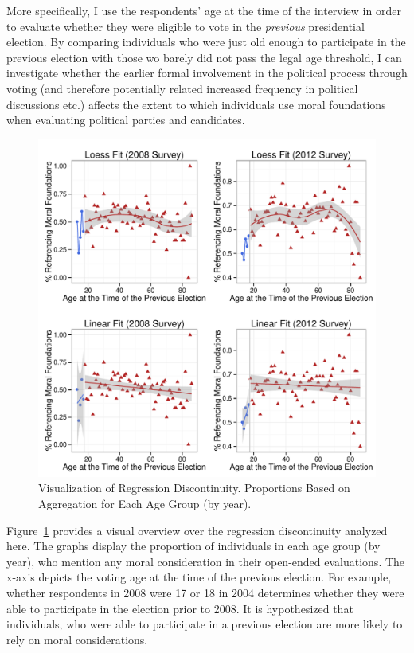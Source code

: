 \documentclass[12pt]{article}
\begin{document}
More specifically, I use the respondents' age at the time of the interview in order to evaluate whether they were eligible to vote in the \textit{previous} presidential election. By comparing individuals who were just old enough to participate in the previous election with those wo barely did not pass the legal age threshold, I can investigate whether the earlier formal involvement in the political process through voting (and therefore potentially related increased frequency in political discussions etc.) affects the extent to which individuals use moral foundations when evaluating political parties and candidates.

\begin{figure}\centering
\includegraphics[scale=.9]{../calc/fig/rd1_overview.pdf}
\caption{Visualization of Regression Discontinuity. Proportions Based on Aggregation for Each Age Group (by year).}\label{fig:rd1_overview}
\end{figure}

Figure~\ref{fig:rd1_overview} provides a visual overview over the regression discontinuity analyzed here. The graphs display the proportion of individuals in each age group (by year), who mention any moral consideration in their open-ended evaluations. The x-axis depicts the voting age at the time of the previous election. For example, whether respondents in 2008 were 17 or 18 in 2004 determines whether they were able to participate in the election prior to 2008. It is hypothesized that individuals, who were able to participate in a previous election are more likely to rely on moral considerations.
\end{document}
